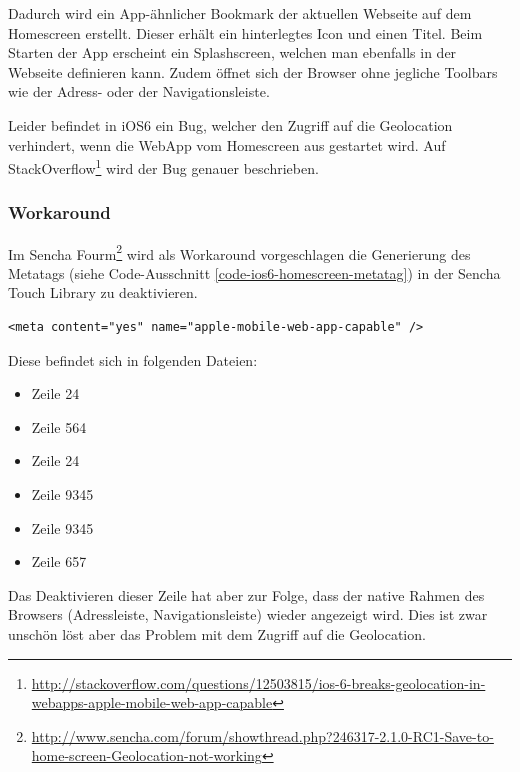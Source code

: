 Dadurch wird ein App-ähnlicher Bookmark der aktuellen Webseite auf dem Homescreen erstellt.
Dieser erhält ein hinterlegtes Icon und einen Titel.
Beim Starten der App erscheint ein Splashscreen, welchen man ebenfalls in der Webseite definieren kann.
Zudem öffnet sich der Browser ohne jegliche Toolbars wie der Adress- oder der Navigationsleiste.

Leider befindet in iOS6 ein Bug, welcher den Zugriff auf die Geolocation verhindert, wenn die \gls{WebApp} vom Homescreen aus gestartet wird.
Auf StackOverflow\footnote{\url{http://stackoverflow.com/questions/12503815/ios-6-breaks-geolocation-in-webapps-apple-mobile-web-app-capable}} wird der Bug genauer beschrieben.

\subsubsection{Workaround}
Im Sencha Fourm\footnote{\url{http://www.sencha.com/forum/showthread.php?246317-2.1.0-RC1-Save-to-home-screen-Geolocation-not-working}} wird als Workaround vorgeschlagen die Generierung des \newline {} Metatags (siehe Code-Ausschnitt \ref{code-ios6-homescreen-metatag}) in der Sencha Touch Library zu deaktivieren.

\lstset{language=HTML}
\begin{lstlisting}[caption=Metatag für iOS6 Workaround, label=code-ios6-homescreen-metatag]
<meta content="yes" name="apple-mobile-web-app-capable" />
\end{lstlisting}

Diese befindet sich in folgenden Dateien:

\begin{itemize}
\item {} Zeile 24
\item {} Zeile 564
\item {} Zeile 24
\item {} Zeile 9345
\item {} Zeile 9345
\item {} Zeile 657
\end{itemize}

Das Deaktivieren dieser Zeile hat aber zur Folge, dass der native Rahmen des Browsers (Adressleiste, Navigationsleiste) wieder angezeigt wird.
Dies ist zwar unschön löst aber das Problem mit dem Zugriff auf die Geolocation.

